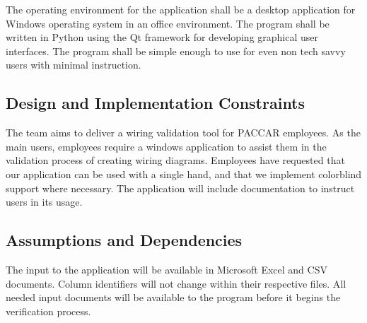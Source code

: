 The operating environment for the application shall be a desktop application for Windows operating system in an office environment. The program shall be written in Python using the Qt framework for developing graphical user interfaces. The program shall be simple enough to use for even non tech savvy users with minimal instruction.

\subsection{Design and Implementation Constraints}
The team aims to deliver a wiring validation tool for PACCAR employees. As the main users, employees require a windows application to assist them in the validation process of creating wiring diagrams. Employees have requested that our application can be used with a single hand, and that we implement colorblind support where necessary. The application will include documentation to instruct users in its usage. 

\subsection{Assumptions and Dependencies}
The input to the application will be available in Microsoft Excel and CSV documents. Column identifiers will not change within their respective files. All needed input documents will be available to the program before it begins the verification process. 

